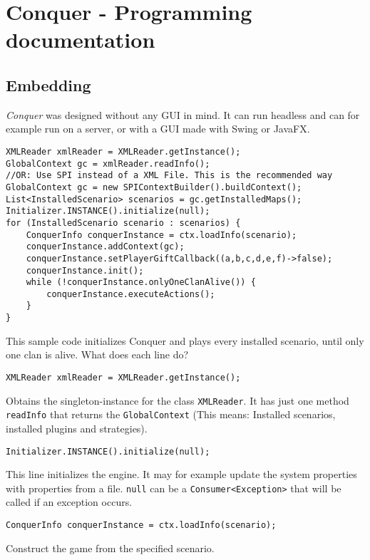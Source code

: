 \documentclass{article}
\begin{document}
    \tableofcontents
    \newpage


    \section{Conquer - Programming documentation}

    \subsection{Embedding}
    \textit{Conquer} was designed without any GUI in mind. It can run headless and can for example run on a server, or with a GUI made with Swing or JavaFX\@.
    \begin{verbatim}
XMLReader xmlReader = XMLReader.getInstance();
GlobalContext gc = xmlReader.readInfo();
//OR: Use SPI instead of a XML File. This is the recommended way
GlobalContext gc = new SPIContextBuilder().buildContext();
List<InstalledScenario> scenarios = gc.getInstalledMaps();
Initializer.INSTANCE().initialize(null);
for (InstalledScenario scenario : scenarios) {
	ConquerInfo conquerInstance = ctx.loadInfo(scenario);
	conquerInstance.addContext(gc);
	conquerInstance.setPlayerGiftCallback((a,b,c,d,e,f)->false);
	conquerInstance.init();
	while (!conquerInstance.onlyOneClanAlive()) {
		conquerInstance.executeActions();
	}
}
    \end{verbatim}
    This sample code initializes Conquer and plays every installed scenario, until only one clan is alive.\newline
    What does each line do?\newline
    \begin{verbatim}
XMLReader xmlReader = XMLReader.getInstance();
    \end{verbatim}
    Obtains the singleton-instance for the class \texttt{XMLReader}. It has just one method \texttt{readInfo} that returns the \texttt{GlobalContext} (This means: Installed scenarios,
    installed plugins and strategies).
    \begin{verbatim}
Initializer.INSTANCE().initialize(null);
    \end{verbatim}
    This line initializes the engine. It may for example update the system properties with properties from a file. \texttt{null} can be a \texttt{Consumer<Exception>} that will be called if an exception
    occurs.
    \begin{verbatim}
ConquerInfo conquerInstance = ctx.loadInfo(scenario);
    \end{verbatim}
    Construct the game from the specified scenario.
\end{document}
